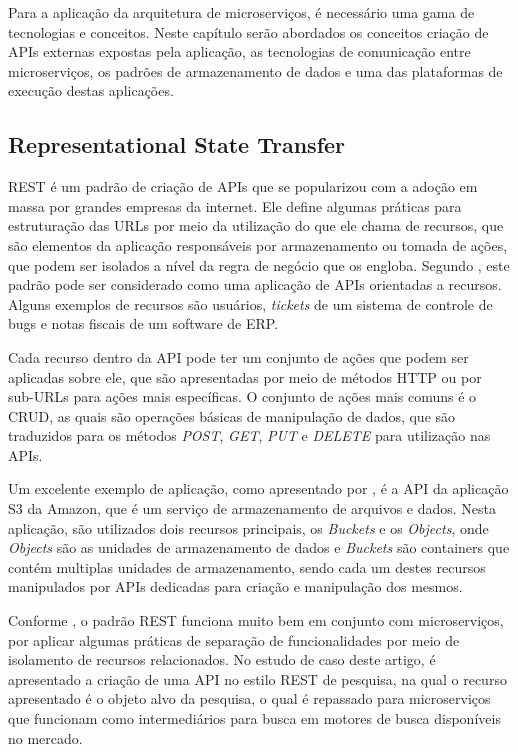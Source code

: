 Para a aplicação da arquitetura de microserviços, é necessário uma gama de
tecnologias e conceitos. Neste capítulo serão abordados os conceitos criação
de APIs externas expostas pela aplicação, as tecnologias de comunicação entre
microserviços, os padrões de armazenamento de dados e uma das plataformas de
execução destas aplicações.

\subsection{Representational State Transfer}

\ac{REST} é um padrão de criação de \acp{API} que se popularizou com a
adoção em massa por grandes empresas da internet. Ele define algumas práticas
para estruturação das \acp{URL} por meio da utilização do que ele chama de
recursos, que são elementos da aplicação responsáveis por armazenamento ou
tomada de ações, que podem ser isolados a nível da regra de negócio que os
engloba. Segundo , este padrão pode ser considerado
como uma aplicação de \acp{API} orientadas a recursos. Alguns exemplos
de recursos são usuários, \emph{tickets} de um sistema de controle de bugs e
notas fiscais de um software de \ac{ERP}.

Cada recurso dentro da \ac{API} pode ter um conjunto de ações que podem ser
aplicadas sobre ele, que são apresentadas por meio de métodos \ac{HTTP} ou
por sub-\acp{URL} para ações mais específicas. O conjunto de ações mais
comuns é o \ac{CRUD}, as quais são operações básicas de manipulação de dados,
que são traduzidos para os métodos \emph{POST}, \emph{GET}, \emph{PUT} e
\emph{DELETE} para utilização nas \acp{API}.

Um excelente exemplo de aplicação, como apresentado por
, é a \ac{API} da aplicação S3 da Amazon, que é
um serviço de armazenamento de arquivos e dados. Nesta aplicação, são
utilizados dois recursos principais, os \emph{Buckets} e os \emph{Objects},
onde \emph{Objects} são as unidades de armazenamento de dados e \emph{Buckets}
são containers que contém multiplas unidades de armazenamento, sendo cada
um destes recursos manipulados por \acp{API} dedicadas para criação e
manipulação dos mesmos.

Conforme , o padrão \ac{REST} funciona muito bem
em conjunto com microserviços, por aplicar algumas práticas de separação
de funcionalidades por meio de isolamento de recursos relacionados. No
estudo de caso deste artigo, é apresentado a criação de uma \ac{API} no
estilo \ac{REST} de pesquisa, na qual o recurso apresentado é o objeto
alvo da pesquisa, o qual é repassado para microserviços que funcionam
como intermediários para busca em motores de busca disponíveis no mercado.

